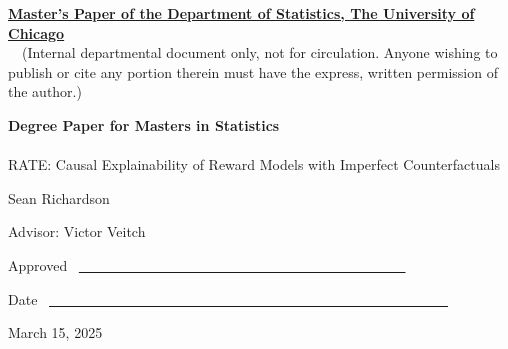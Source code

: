 \documentclass[12pt]{article}
\begin{document}
    \noindent
    \thispagestyle{empty}
    \underline{\bf Master's Paper of the Department of Statistics, The University of Chicago}
    \\~~(Internal departmental document only, not for circulation. Anyone wishing to publish or cite any portion therein must have the express, written permission of the author.)

    \vspace{1.8in}
    \begin{center}
    {\bf\LARGE Degree Paper for Masters in Statistics}
    \\~\\
    {\Large RATE: Causal Explainability of Reward Models with Imperfect Counterfactuals}

    \vspace{1.4in}
    {\Large Sean Richardson}

    \vspace{1.3in}
    {\Large Advisor: Victor Veitch}

    \end{center}

    \vspace{.6in}
    {\Large Approved} ~\underline{~~~~~~~~~~~~~~~~~~
    ~~~~~~~~~~~~~~~~~~~~~~~~~~~~}

    \vspace{.2in}
    {\Large Date} ~\underline{~~~~~~~~~~~~~~~~~~~~~~~~~~~~~~~~~~~~~~~~~~~~~~~~~~~~~~~~~}

    \vfill
    \begin{center}{\large March 15, 2025}\end{center}
    
\end{document}

